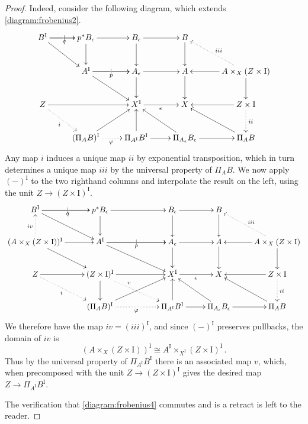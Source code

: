 \documentclass[11pt]{article}
\newcommand{\ra}{\ensuremath{\rightarrow}}
\newcommand{\I}{\ensuremath{\mathrm{I}}}
\theoremstyle{remark}
\theoremstyle{definition}
\begin{document}
\begin{proof}
Indeed, consider the following diagram, which extends \eqref{diagram:frobenius2}.
\begin{equation}\label{diagram:frobenius7}
\xymatrix{
B^\I \ar[r]|| \ar[r]_{q} \ar[rd]  & p^*B_\epsilon \ar[r]  \ar[d]  & B_{\epsilon}  \ar[d]   \ar[r] & B \ar[d]& \\
& A^\I \ar[r]|| \ar[r]_{p}  \ar[rd]  & A_{\epsilon} \ar[d]   \ar[r] & A \ar[d]& \ar[d] \ar[l] \ar@{..>}[lu]_{iii}A\times_X (Z\times \I) \\
Z \ar[rr] \ar@{..>}[rd]_-{i} && X^\I \ar[r]_{\epsilon} &  X & \ar[l] \ar@{..>}[d]^{ii} Z\times \I\\
& (\Pi_AB)^\I \ar[ru] \ar@{..>}[r]_\varphi  & \Pi_{A^\I}B^\I   \ar[u] \ar[r] & \Pi_{A_\epsilon}B_\epsilon  \ar[lu] \ar[r] & \Pi_AB \ar[lu]
}
\end{equation}
Any map $i$ induces a unique map $ii$ by exponential transposition, which in turn determines a unique map $iii$ by the universal property of $\Pi_AB$.  We now apply $(-)^\I$ to the two righthand columns and interpolate the result on the left, using the unit $Z \ra (Z\times \I)^\I$.
\begin{equation*}\label{diagram:frobenius8}
\xymatrix{
B^\I \ar[r]|| \ar[r]_{q} \ar[rd]  & p^*B_\epsilon \ar[rr]  \ar[d]  && B_{\epsilon}  \ar[d]   \ar[r] & B \ar[d]& \\
(A\times_X (Z\times \I))^\I \ar[r] \ar[rd] \ar@{..>}[u]^{iv} & A^\I \ar[rr]|| \ar[rr]_{p}  \ar[rrd]  && A_{\epsilon} \ar[d]   \ar[r] & A \ar[d]
	& \ar[d] \ar[l] \ar@{..>}[lu]_{iii} A\times_X (Z\times \I) \\
Z \ar[r] \ar@{..>}[rd]_-{i} & (Z\times \I)^\I \ar[rr] \ar[d] \ar@{..>}[rrd]^<<<<<<<{v} && X^\I \ar[r]_{\epsilon} &  X & \ar[l] \ar@{..>}[d]^{ii} Z\times \I\\
& (\Pi_AB)^\I \ar[rru] \ar@{..>}[rr]_\varphi  && \Pi_{A^\I}B^\I   \ar[u] \ar[r]  & \Pi_{A_\epsilon}B_\epsilon  \ar[lu] \ar[r] & \Pi_AB \ar[lu]
}
\end{equation*}
We therefore have the map $iv = (iii)^\I$, and since $(-)^\I$ preserves pullbacks, the domain of $iv$ is
\[
(A\times_X (Z\times \I))^\I \cong A^\I\times_{X^\I} (Z\times \I)^\I\,.
\]  
Thus by the universal property of $\Pi_{A^\I}B^\I$ there is an associated map $v$, which, when precomposed with the unit $Z \ra (Z\times \I)^\I$ gives the desired map $Z \to \Pi_{A^\I}B^\I$.

The verification that \eqref{diagram:frobenius4} commutes and is a retract is left to the reader.
\end{proof}
\end{document}

